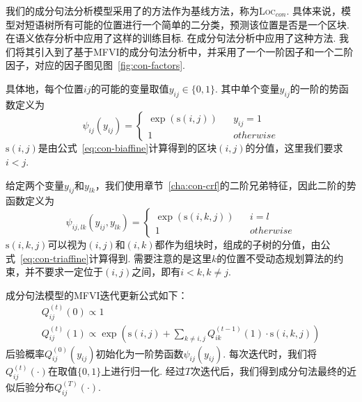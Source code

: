 我们的成分句法分析模型采用了\citet{gaddy-etal-2018-whats}的方法作为基线方法，称为\textsc{Loc}$_{con}$.
具体来说，模型对短语树所有可能的位置进行一个简单的二分类，预测该位置是否是一个区块.
\citet{dozat-manning-2018-simpler,wang-etal-2019-second}在语义依存分析中应用了这样的训练目标.
\citet{gormley-eisner-2015-structured,naradowsky-etal-2012-grammarless}在成分句法分析中应用了这种方法.
我们将其引入到了基于MFVI的成分句法分析中，并采用了一个一阶因子和一个二阶因子，对应的因子图见图~\ref{fig:con-factors}.

具体地，每个位置$ij$的可能的变量取值$y_{ij}\in \{0,1\}$.
其中单个变量$y_{ij}$的一阶的势函数定义为
\begin{equation}
	\label{eq:con-1o-potential}
	\psi_{ij}(y_{ij})=\left\{
	\begin{array}{rcl}
		\exp\left(\mathrm{s}(i,j)\right) &   & {y_{ij}=1}  \\
		1                                &   & {otherwise}
	\end{array}
	\right.
\end{equation}
$\mathrm{s}(i,j)$是由公式~\ref{eq:con-biaffine}计算得到的区块$(i,j)$的分值，这里我们要求$i<j$.

给定两个变量$y_{ij}$和$y_{lk}$，我们使用章节~\ref{cha:con-crf}的二阶兄弟特征，因此二阶的势函数定义为
\begin{equation}
	\label{eq:2o-con-potential}
	\psi_{ij,lk}(y_{ij},y_{lk})=\left\{
	\begin{array}{rcl}
		\exp\left(\mathrm{s}(i,k,j)\right) &   & {i=l}       \\
		1                                  &   & {otherwise}
	\end{array}
	\right.
\end{equation}
$\mathrm{s}(i,k,j)$可以视为$(i,j)$和$(i,k)$都作为组块时，组成的子树的分值，由公式~\ref{eq:con-triaffine}计算得到.
需要注意的是这里$k$的位置不受动态规划算法的约束，并不要求一定位于$(i,j)$之间，即有$i<k,k\neq j$.

成分句法模型的MFVI迭代更新公式如下：
\begin{equation}
	\label{eq:mfvi-con}
	\begin{array}{l}
		Q_{ij}^{(t)}(0)\propto 1                                                                                            \\
		Q_{ij}^{(t)}(1)\propto \exp\left(\mathrm{s}(i,j) +\sum_{k\neq i,j} Q_{ik}^{(t-1)}(1)\cdot \mathrm{s}(i,k,j) \right)
	\end{array}
\end{equation}
后验概率$Q_{ij}^{(0)}(y_{ij})$初始化为一阶势函数$\psi_{ij}(y_{ij})$.
每次迭代时，我们将$Q_{ij}^{(t)}(\cdot)$在取值$\{0,1\}$上进行归一化.
经过$T$次迭代后，我们得到成分句法最终的近似后验分布$Q_{ij}^{(T)}(\cdot)$.

